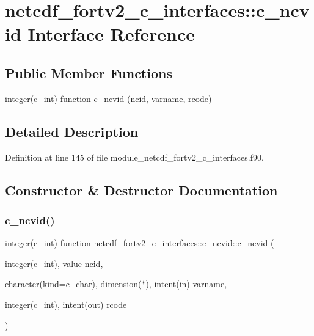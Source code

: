 \hypertarget{interfacenetcdf__fortv2__c__interfaces_1_1c__ncvid}{}\section{netcdf\+\_\+fortv2\+\_\+c\+\_\+interfaces\+:\+:c\+\_\+ncvid Interface Reference}
\label{interfacenetcdf__fortv2__c__interfaces_1_1c__ncvid}
\subsection*{Public Member Functions}
\begin{DoxyCompactItemize}
\item 
integer(c\+\_\+int) function \hyperlink{interfacenetcdf__fortv2__c__interfaces_1_1c__ncvid_ac3d7799dfbf4c1630efc3091a32b6176}{c\+\_\+ncvid} (ncid, varname, rcode)
\end{DoxyCompactItemize}


\subsection{Detailed Description}


Definition at line 145 of file module\+\_\+netcdf\+\_\+fortv2\+\_\+c\+\_\+interfaces.\+f90.



\subsection{Constructor \& Destructor Documentation}
\mbox{\label{interfacenetcdf__fortv2__c__interfaces_1_1c__ncvid_ac3d7799dfbf4c1630efc3091a32b6176}} 
\subsubsection{\texorpdfstring{c\+\_\+ncvid()}{c\_ncvid()}}
{\footnotesize\ttfamily integer(c\+\_\+int) function netcdf\+\_\+fortv2\+\_\+c\+\_\+interfaces\+::c\+\_\+ncvid\+::c\+\_\+ncvid (\begin{DoxyParamCaption}\item[{integer(c\+\_\+int), value}]{ncid,  }\item[{character(kind=c\+\_\+char), dimension($\ast$), intent(in)}]{varname,  }\item[{integer(c\+\_\+int), intent(out)}]{rcode }\end{DoxyParamCaption})}



